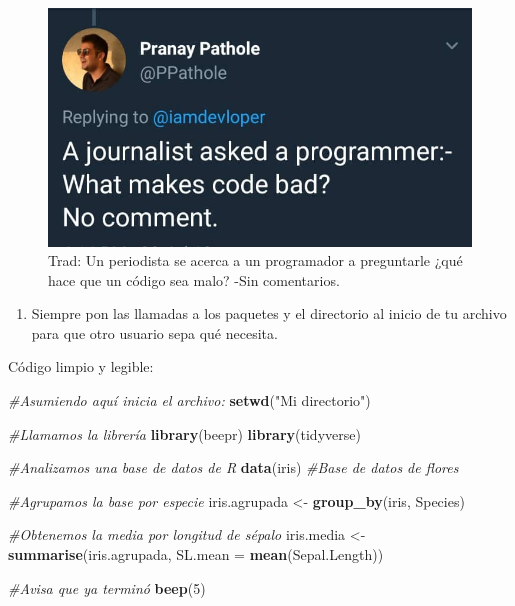 \documentclass[
]{book}
\newenvironment{Shaded}{\begin{snugshade}}{\end{snugshade}}
\newcommand{\CommentTok}[1]{\textcolor[rgb]{0.56,0.35,0.01}{\textit{#1}}}
\newcommand{\DataTypeTok}[1]{\textcolor[rgb]{0.13,0.29,0.53}{#1}}
\newcommand{\DecValTok}[1]{\textcolor[rgb]{0.00,0.00,0.81}{#1}}
\newcommand{\KeywordTok}[1]{\textcolor[rgb]{0.13,0.29,0.53}{\textbf{#1}}}
\newcommand{\NormalTok}[1]{#1}
\newcommand{\StringTok}[1]{\textcolor[rgb]{0.31,0.60,0.02}{#1}}
\providecommand{\tightlist}{%
  \setlength{\itemsep}{0pt}\setlength{\parskip}{0pt}}
\begin{document}
\begin{figure}

{\centering \includegraphics[width=10in]{images/tweet1} 

}

\caption{Trad: Un periodista se acerca a un programador a preguntarle ¿qué hace que un código sea malo? -Sin comentarios.}\label{fig:unnamed-chunk-105}
\end{figure}

\begin{enumerate}
\def\labelenumi{\arabic{enumi}.}
\setcounter{enumi}{6}
\tightlist
\item
  Siempre pon las llamadas a los paquetes y el directorio al inicio de tu archivo para que otro usuario sepa qué necesita.
\end{enumerate}

Código limpio y legible:

\begin{Shaded}
\begin{Highlighting}[]
\CommentTok{#Asumiendo aquí inicia el archivo:}
\KeywordTok{setwd}\NormalTok{(}\StringTok{"Mi directorio"}\NormalTok{)}

\CommentTok{#Llamamos la librería}
\KeywordTok{library}\NormalTok{(beepr)}
\KeywordTok{library}\NormalTok{(tidyverse)}

\CommentTok{#Analizamos una base de datos de R}
\KeywordTok{data}\NormalTok{(iris) }\CommentTok{#Base de datos de flores}

\CommentTok{#Agrupamos la base por especie}
\NormalTok{iris.agrupada <-}\StringTok{ }\KeywordTok{group_by}\NormalTok{(iris, Species)}

\CommentTok{#Obtenemos la media por longitud de sépalo}
\NormalTok{iris.media    <-}\StringTok{ }\KeywordTok{summarise}\NormalTok{(iris.agrupada, }\DataTypeTok{SL.mean =} \KeywordTok{mean}\NormalTok{(Sepal.Length))}

\CommentTok{#Avisa que ya terminó}
\KeywordTok{beep}\NormalTok{(}\DecValTok{5}\NormalTok{)}
\end{Highlighting}
\end{Shaded}
\end{document}
